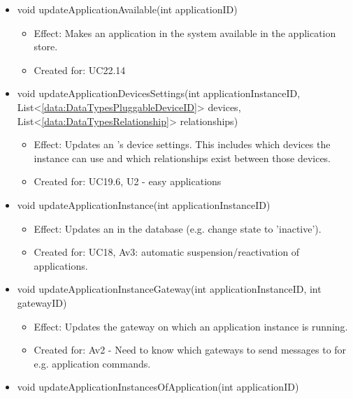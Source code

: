 \begin{description}
\begin{itemize}[noitemsep,nolistsep,leftmargin=-.25cm]
      \item \textsf{void updateApplicationAvailable(int applicationID)}
        \begin{itemize}[noitemsep,nolistsep]
           \item Effect: Makes an application in the system available in the application store.
\item Created for: UC22.14
        \end{itemize}
      \item \textsf{void updateApplicationDevicesSettings(int applicationInstanceID, List\textless{}\ref{data:DataTypesPluggableDeviceID}\textgreater{} devices, List\textless{}\ref{data:DataTypesRelationship}\textgreater{} relationships)}
        \begin{itemize}[noitemsep,nolistsep]
           \item Effect: Updates an 's device settings. This includes which devices the instance can use and which relationships exist between those devices.
\item Created for: UC19.6, U2 - easy applications
        \end{itemize}
      \item \textsf{void updateApplicationInstance(int applicationInstanceID)}
        \begin{itemize}[noitemsep,nolistsep]
           \item Effect: Updates an  in the database (e.g. change state to 'inactive').
\item Created for: UC18, Av3: automatic suspension/reactivation of applications.
        \end{itemize}
      \item \textsf{void updateApplicationInstanceGateway(int applicationInstanceID, int gatewayID)}
        \begin{itemize}[noitemsep,nolistsep]
           \item Effect: Updates the gateway on which an application instance is running.
\item Created for: Av2 - Need to know which gateways to send messages to for e.g. application commands.
        \end{itemize}
      \item \textsf{void updateApplicationInstancesOfApplication(int applicationID)}
        \begin{itemize}

\end{itemize}
\end{itemize}
\end{description}
